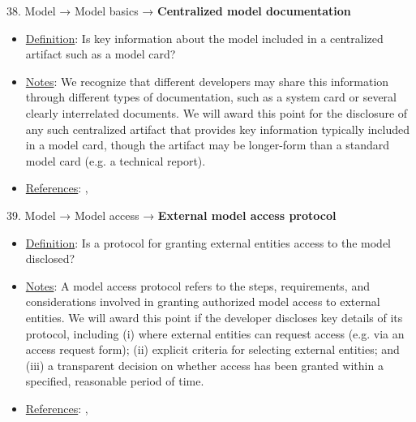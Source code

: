 38. Model → Model basics → \textbf{Centralized model documentation}
\vspace{-\parskip}
\begin{itemize}
	\item
	\underline{Definition}: Is key information about the model included in a centralized artifact such as a model card?
	\item
	\underline{Notes}: We recognize that different developers may share this information through different types of documentation, such as a system card or several clearly interrelated documents. We will award this point for the disclosure of any such centralized artifact that provides key information typically included in a model card, though the artifact may be longer-form than a standard model card (e.g. a technical report).
	\item
	\underline{References}: \citet{mitchell2019model}, \citet{crisan2022interactive}
\end{itemize}


39. Model → Model access → \textbf{External model access protocol}
\vspace{-\parskip}
\begin{itemize}
	\item
	\underline{Definition}: Is a protocol for granting external entities access to the model disclosed?
	\item
	\underline{Notes}: A model access protocol refers to the steps, requirements, and considerations involved in granting authorized model access to external entities. We will award this point if the developer discloses key details of its protocol, including (i) where external entities can request access (e.g. via an access request form); (ii) explicit criteria for selecting external entities; and (iii) a transparent decision on whether access has been granted within a specified, reasonable period of time.
	\item
	\underline{References}: \citet{solaiman2023gradient}, \citet{shevlane2022structured}
\end{itemize}


